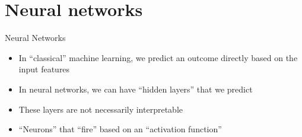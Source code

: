 \documentclass[compress]{beamer}
\begin{document}
%	
%	
%	
%
%
%

\section{Neural networks}

\begin{frame}{Neural Networks}
	\begin{itemize}
		\item In ``classical'' machine learning, we predict an outcome directly based on the input features
		\item In neural networks, we can have ``hidden layers'' that we predict
		\item These layers are not necessarily interpretable
		\item ``Neurons'' that ``fire'' based on an ``activation function''
	\end{itemize}
	
\end{frame}
\end{document}
